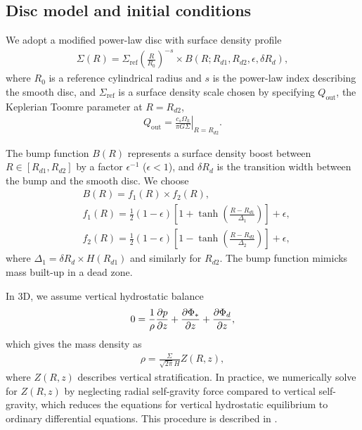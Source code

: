 \subsection{Disc model and initial conditions}
We adopt a modified power-law disc with surface
density profile 
\begin{align}
  \Sigma(R) = \Sigma_\mathrm{ref} \left(\frac{R}{R_0}\right)^{-s}\times B(R;
  R_{d1}, R_{d2}, \epsilon, \delta R_d), 
\end{align}
where $R_0$ is a reference cylindrical radius and $s$ is the power-law
index describing the smooth disc, and $\Sigma_\mathrm{ref}$ is a
surface density scale chosen by specifying $Q_\mathrm{out}$,
the Keplerian Toomre parameter at $R=R_{d2}$,
\begin{align}
  Q_\mathrm{out} = \left.\frac{c_s\Omega_k}{\pi G
    \Sigma}\right|_{R=R_{d2}}. 
\end{align}

The bump function
$B(R)$ represents a surface density boost between
$R\in[R_{d1},R_{d2}]$ by a factor $\epsilon^{-1}$ ($\epsilon < 1$),
and $\delta R_d$ is the transition width between the bump and the
smooth disc. We choose 
\begin{align}
  &B(R) = f_1(R)\times f_2(R),\\
  &f_1(R) = \frac{1}{2}\left(1 - \epsilon\right)\left[1 +
    \tanh\left(\frac{R-R_{d1}}{\Delta_1}\right)\right]  + \epsilon,\\
  &f_2(R) = \frac{1}{2}\left(1 - \epsilon\right)\left[1 -
    \tanh\left(\frac{R-R_{d2}}{\Delta_2}\right)\right]  + \epsilon,
\end{align}
where $\Delta_1 = \delta R_d \times H(R_{d1})$ and similarly for
$R_{d2}$. The bump function mimicks mass built-up in a dead zone.


In 3D, we assume vertical hydrostatic balance
\begin{align}
  0 = \frac{1}{\rho}\frac{\partial p}{\partial z} + \frac{\partial\Phi_*}{\partial z} + \frac{\partial
    \Phi_d}{\partial z},  
\end{align}
which gives the mass density as 
\begin{align}
  \rho = \frac{\Sigma}{\sqrt{2\pi}H}Z(R,z),
\end{align}
where $Z(R,z)$ describes vertical stratification. In practice, we
numerically solve for $Z(R,z)$ by neglecting radial self-gravity
force compared to vertical self-gravity, which reduces the equations
for vertical hydrostatic equilibrium to ordinary differential
equations.  This procedure is described in \cite{lin12b}. 

